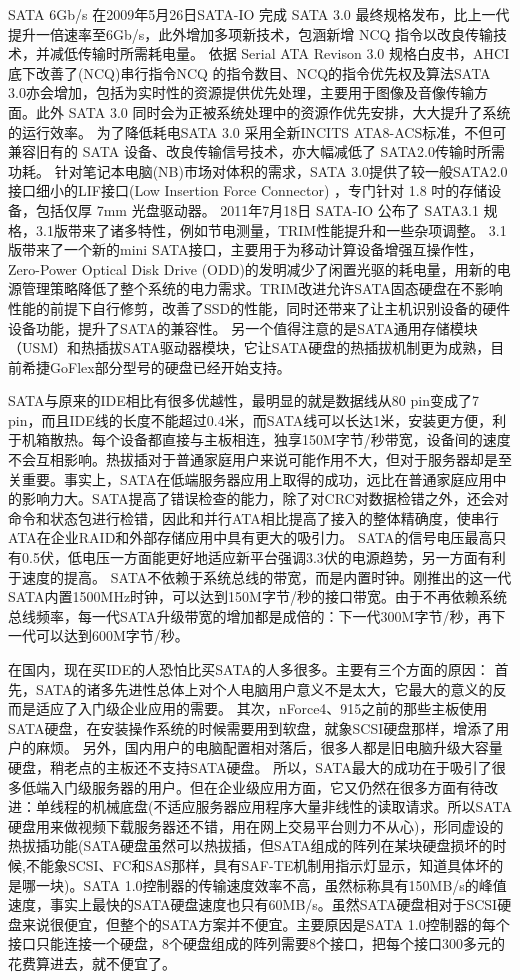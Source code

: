 SATA 6Gb/s 在2009年5月26日SATA-IO 完成 SATA 3.0 最终规格发布，比上一代提升一倍速率至6Gb/s，此外增加多项新技术，包涵新增 NCQ 指令以改良传输技术，并减低传输时所需耗电量。
依据 Serial ATA Revison 3.0 规格白皮书，AHCI底下改善了(NCQ)串行指令NCQ 的指令数目、NCQ的指令优先权及算法SATA 3.0亦会增加，包括为实时性的资源提供优先处理，主要用于图像及音像传输方面。此外 SATA 3.0 同时会为正被系统处理中的资源作优先安排，大大提升了系统的运行效率。
为了降低耗电SATA 3.0 采用全新INCITS ATA8-ACS标准，不但可兼容旧有的 SATA 设备、改良传输信号技术，亦大幅减低了 SATA2.0传输时所需功耗。
针对笔记本电脑(NB)市场对体积的需求，SATA 3.0提供了较一般SATA2.0接口细小的LIF接口(Low Insertion Force Connector) ，专门针对 1.8 吋的存储设备，包括仅厚 7mm 光盘驱动器。
2011年7月18日 SATA-IO 公布了 SATA3.1 规格，3.1版带来了诸多特性，例如节电测量，TRIM性能提升和一些杂项调整。
3.1版带来了一个新的mini SATA接口，主要用于为移动计算设备增强互操作性，Zero-Power Optical Disk Drive (ODD)的发明减少了闲置光驱的耗电量，用新的电源管理策略降低了整个系统的电力需求。TRIM改进允许SATA固态硬盘在不影响性能的前提下自行修剪，改善了SSD的性能，同时还带来了让主机识别设备的硬件设备功能，提升了SATA的兼容性。
另一个值得注意的是SATA通用存储模块（USM）和热插拔SATA驱动器模块，它让SATA硬盘的热插拔机制更为成熟，目前希捷GoFlex部分型号的硬盘已经开始支持。

SATA与原来的IDE相比有很多优越性，最明显的就是数据线从80 pin变成了7 pin，而且IDE线的长度不能超过0.4米，而SATA线可以长达1米，安装更方便，利于机箱散热。每个设备都直接与主板相连，独享150M字节/秒带宽，设备间的速度不会互相影响。热拔插对于普通家庭用户来说可能作用不大，但对于服务器却是至关重要。事实上，SATA在低端服务器应用上取得的成功，远比在普通家庭应用中的影响力大。SATA提高了错误检查的能力，除了对CRC对数据检错之外，还会对命令和状态包进行检错，因此和并行ATA相比提高了接入的整体精确度，使串行ATA在企业RAID和外部存储应用中具有更大的吸引力。 SATA的信号电压最高只有0.5伏，低电压一方面能更好地适应新平台强调3.3伏的电源趋势，另一方面有利于速度的提高。 SATA不依赖于系统总线的带宽，而是内置时钟。刚推出的这一代SATA内置1500MHz时钟，可以达到150M字节/秒的接口带宽。由于不再依赖系统总线频率，每一代SATA升级带宽的增加都是成倍的：下一代300M字节/秒，再下一代可以达到600M字节/秒。

在国内，现在买IDE的人恐怕比买SATA的人多很多。主要有三个方面的原因： 
首先，SATA的诸多先进性总体上对个人电脑用户意义不是太大，它最大的意义的反而是适应了入门级企业应用的需要。 
其次，nForce4、915之前的那些主板使用SATA硬盘，在安装操作系统的时候需要用到软盘，就象SCSI硬盘那样，增添了用户的麻烦。 
另外，国内用户的电脑配置相对落后，很多人都是旧电脑升级大容量硬盘，稍老点的主板还不支持SATA硬盘。 
所以，SATA最大的成功在于吸引了很多低端入门级服务器的用户。但在企业级应用方面，它又仍然在很多方面有待改进：单线程的机械底盘(不适应服务器应用程序大量非线性的读取请求。所以SATA硬盘用来做视频下载服务器还不错，用在网上交易平台则力不从心)，形同虚设的热拔插功能(SATA硬盘虽然可以热拔插，但SATA组成的阵列在某块硬盘损坏的时候,不能象SCSI、FC和SAS那样，具有SAF-TE机制用指示灯显示，知道具体坏的是哪一块)。SATA 1.0控制器的传输速度效率不高，虽然标称具有150MB/s的峰值速度，事实上最快的SATA硬盘速度也只有60MB/s。虽然SATA硬盘相对于SCSI硬盘来说很便宜，但整个的SATA方案并不便宜。主要原因是SATA 1.0控制器的每个接口只能连接一个硬盘，8个硬盘组成的阵列需要8个接口，把每个接口300多元的花费算进去，就不便宜了。 

